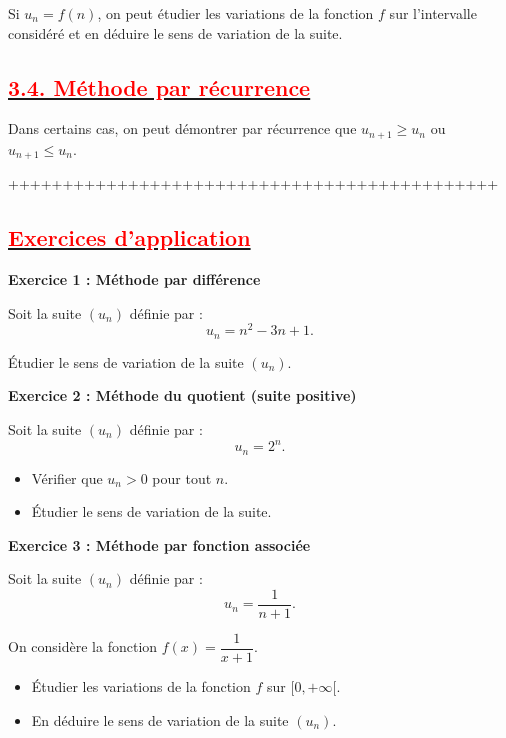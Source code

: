\documentclass[12pt,a4paper]{article}
\begin{document}
	Si $u_n=f(n)$, on peut étudier les variations de la fonction $f$ 
	sur l'intervalle considéré et en déduire le sens de variation de la suite.

\subsection*{\underline{\textbf{\textcolor{red}{3.4. Méthode par récurrence}}}}   
	
	Dans certains cas, on peut démontrer par récurrence que 
	$u_{n+1} \geq u_n$ ou $u_{n+1} \leq u_n$.

+++++++++++++++++++++++++++++++++++++++++++++

\subsection*{\underline{\textbf{\textcolor{red}{Exercices d'application}}}} 

\textbf{Exercice 1 : Méthode par différence}

Soit la suite $\left(u_n\right)$ définie par :
\[
u_n = n^2 - 3n + 1.
\]

Étudier le sens de variation de la suite $\left(u_n\right)$.

\bigskip

\textbf{Exercice 2 : Méthode du quotient (suite positive)}

Soit la suite $\left(u_n\right)$ définie par :
\[
u_n = 2^n.
\]

\begin{itemize}
	\item Vérifier que $u_n>0$ pour tout $n$.
	\item Étudier le sens de variation de la suite.
\end{itemize}

\bigskip

\textbf{Exercice 3 : Méthode par fonction associée}

Soit la suite $\left(u_n\right)$ définie par :
\[
u_n = \dfrac{1}{n+1}.
\]

On considère la fonction $f(x)=\dfrac{1}{x+1}$.

\begin{itemize}
	\item Étudier les variations de la fonction $f$ sur $[0,+\infty[$.
	\item En déduire le sens de variation de la suite $\left(u_n\right)$.
\end{itemize}

\bigskip
\end{document}
